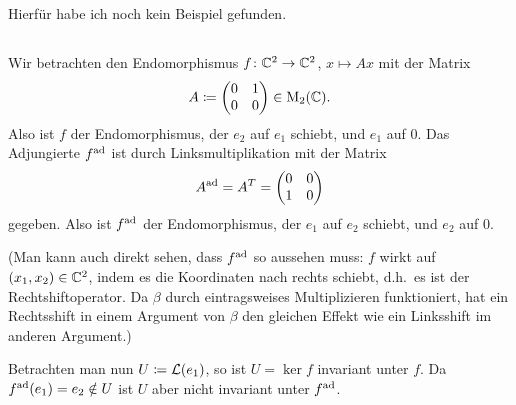 \documentclass[a4paper,10pt,numbers=noenddot]{scrartcl}
\begin{document}
Hierfür habe ich noch kein Beispiel gefunden.





\subsection{}

Wir betrachten den Endomorphismus $f \colon \mathbb{C}^2 \to \mathbb{C}^2$, $x \mapsto Ax$ mit der Matrix
\[
  A
  \coloneqq
  \begin{pmatrix}
    0 & 1 \\
    0 & 0
  \end{pmatrix}
  \in
  \operatorname{M}_2(\mathbb{C}).
\]
Also ist $f$ der Endomorphismus, der $e_2$ auf $e_1$ schiebt, und $e_1$ auf $0$.
Das Adjungierte $f^{\mathrm{ad}}$ ist durch Linksmultiplikation mit der Matrix
\[
    A^{\mathrm{ad}}
  = A^T
  =
  \begin{pmatrix}
    0 & 0 \\
    1 & 0
  \end{pmatrix}
\]
gegeben.
Also ist $f^{\mathrm{ad}}$ der Endomorphismus, der $e_1$ auf $e_2$ schiebt, und $e_2$ auf $0$.

(Man kann auch direkt sehen, dass $f^{\mathrm{ad}}$ so aussehen muss:
$f$ wirkt auf $(x_1, x_2) \in \mathbb{C}^2$, indem es die Koordinaten nach rechts schiebt, d.h.\ es ist der Rechtshiftoperator.
Da $\beta$ durch eintragsweises Multiplizieren funktioniert, hat ein Rechtsshift in einem Argument von $\beta$ den gleichen Effekt wie ein Linksshift im anderen Argument.)

Betrachten man nun $U \coloneqq \operatorname{\mathcal{L}}(e_1)$, so ist $U = \ker f$ invariant unter $f$.
Da $f^{\mathrm{ad}}(e_1) = e_2 \notin U$ ist $U$ aber nicht invariant unter $f^{\mathrm{ad}}$.
\end{document}
